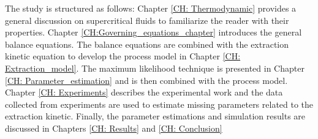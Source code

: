 \documentclass[../Article_Model_Parameters.tex]{subfiles}
\begin{document}
	The study is structured as follows: Chapter \ref{CH: Thermodynamic} provides a general discussion on supercritical fluids to familiarize the reader with their properties. Chapter \ref{CH:Governing_equations_chapter} introduces the general balance equations. The balance equations are combined with the extraction kinetic equation to develop the process model in Chapter \ref{CH: Extraction_model}. The maximum likelihood technique is presented in Chapter \ref{CH: Parameter_estimation} and is then combined with the process model. Chapter \ref{CH: Experiments} describes the experimental work and the data collected from experiments are used to estimate missing parameters related to the extraction kinetic. Finally, the parameter estimations and simulation results are discussed in Chapters \ref{CH: Results} and \ref{CH: Conclusion}
		
\end{document}

